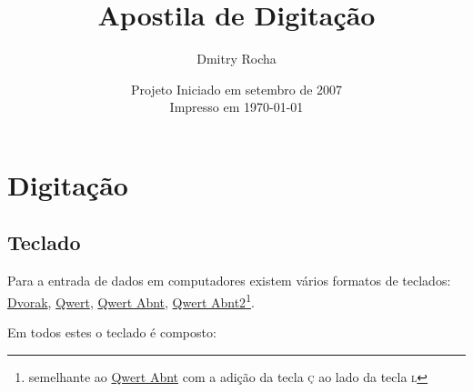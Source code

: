\documentclass[12pt,a4]{book}
\author{Dmitry Rocha}
\title{Apostila de Digitação}
\date{Projeto Iniciado em setembro de 2007 \\ Impresso em \today}
\begin{document}
\maketitle

\pagestyle{fancy}
\tableofcontents

%

\chapter{Digitação}

\section{Teclado}

Para a entrada de dados em computadores existem vários formatos de teclados:
\underline{Dvorak}, \underline{Qwert}, \underline{Qwert Abnt},
\underline{Qwert Abnt2}\footnote{semelhante ao \underline{Qwert Abnt} com a
adição da tecla \textsc{ç} ao lado da tecla \textsc{l}}.

Em todos estes o teclado é composto:
\end{document}
